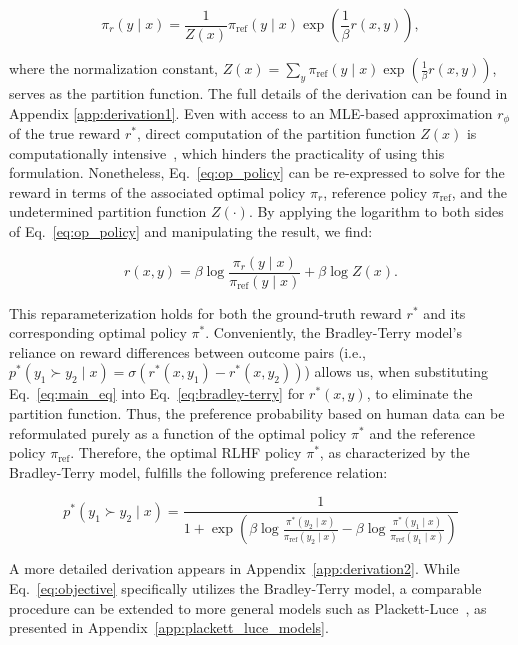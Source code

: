 \begin{equation}\label{eq:op_policy}
    \pi_r(y\mid x) = \frac{1}{Z(x)}\pi_\text{ref}(y\mid x)\exp\left(\frac{1}{\beta}r(x, y)\right),
\end{equation}

where the normalization constant, $Z(x) =\sum_{y}\pi_\text{ref}(y\mid x)\exp\left(\frac{1}{\beta}r(x, y)\right)$, serves as the partition function. The full details of the derivation can be found in Appendix \ref{app:derivation1}. Even with access to an MLE-based approximation $r_\phi$ of the true reward $r^*$, direct computation of the partition function $Z(x)$ is computationally intensive~\citep{korbak2022reinforcement, go2023aligning}, which hinders the practicality of using this formulation. Nonetheless, Eq.~\ref{eq:op_policy} can be re-expressed to solve for the reward in terms of the associated optimal policy $\pi_r$, reference policy $\pi_\text{ref}$, and the undetermined partition function $Z(\cdot)$. By applying the logarithm to both sides of Eq.~\ref{eq:op_policy} and manipulating the result, we find:

\begin{equation}\label{eq:main_eq}
    r(x,y) =\beta \log \frac{\pi_r(y\mid x)}{\pi_\text{ref}(y\mid x)} + \beta \log Z(x).
\end{equation}

This reparameterization holds for both the ground-truth reward $r^*$ and its corresponding optimal policy $\pi^*$. Conveniently, the Bradley-Terry model’s reliance on reward differences between outcome pairs (i.e., ${p^*(y_1 \succ y_2 \mid x) = \sigma(r^*(x, y_1) - r^*(x, y_2))}$) allows us, when substituting Eq.~\ref{eq:main_eq} into Eq.~\ref{eq:bradley-terry} for $r^*(x,y)$, to eliminate the partition function. Thus, the preference probability based on human data can be reformulated purely as a function of the optimal policy $\pi^*$ and the reference policy $\pi_\text{ref}$. Therefore, the optimal RLHF policy $\pi^*$, as characterized by the Bradley-Terry model, fulfills the following preference relation:

\begin{equation}\label{eq:objective}
    p^*(y_1\succ y_2 \mid x)=\frac{1}{1 + \exp\left(\beta \log \frac{\pi^*(y_2\mid x)}{\pi_\text{ref}(y_2\mid x)} - \beta \log \frac{\pi^*(y_1\mid x)}{\pi_\text{ref}(y_1\mid x)}\right)}
\end{equation}

A more detailed derivation appears in Appendix~\ref{app:derivation2}. While Eq.~\ref{eq:objective} specifically utilizes the Bradley-Terry model, a comparable procedure can be extended to more general models such as Plackett-Luce~\citep{plackett1975analysis, luce2012individual}, as presented in Appendix~\ref{app:plackett_luce_models}.

